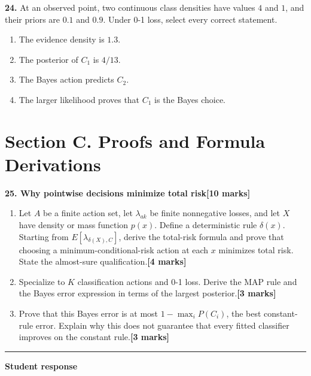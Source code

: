 \documentclass[11pt,a4paper]{article}
\begin{document}
\par\noindent\begin{minipage}{\linewidth}
\textbf{24.} At an observed point, two continuous class densities have values \(4\) and \(1\), and their priors are \(0.1\) and \(0.9\). Under 0-1 loss, select every correct statement.
\begin{enumerate}[label=(\Alph*),leftmargin=8mm,itemsep=2pt,topsep=2pt]
\item The evidence density is \(1.3\).
\item The posterior of \(C_1\) is \(4/13\).
\item The Bayes action predicts \(C_2\).
\item The larger likelihood proves that \(C_1\) is the Bayes choice.
\end{enumerate}

\end{minipage}\par\vspace{3mm}
\newpage\section*{Section C. Proofs and Formula Derivations}
\textbf{25. Why pointwise decisions minimize total risk}\hfill\textbf{[10 marks]}\par\medskip
\begin{enumerate}[label=(\alph*),leftmargin=8mm,itemsep=3pt]
\item Let \(A\) be a finite action set, let \(\lambda_{ak}\) be finite nonnegative losses, and let \(X\) have density or mass function \(p(x)\). Define a deterministic rule \(\delta(x)\). Starting from \(E[\lambda_{\delta(X),C}]\), derive the total-risk formula and prove that choosing a minimum-conditional-risk action at each \(x\) minimizes total risk. State the almost-sure qualification.\hfill\textbf{[4 marks]}
\item Specialize to \(K\) classification actions and 0-1 loss. Derive the MAP rule and the Bayes error expression in terms of the largest posterior.\hfill\textbf{[3 marks]}
\item Prove that this Bayes error is at most \(1-\max_iP(C_i)\), the best constant-rule error. Explain why this does not guarantee that every fitted classifier improves on the constant rule.\hfill\textbf{[3 marks]}
\end{enumerate}\par\medskip\hrule\medskip\textbf{Student response}\par
\end{document}
